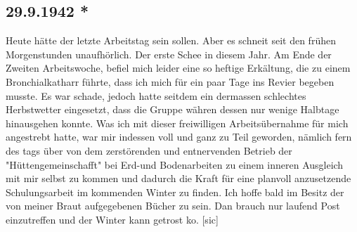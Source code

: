 \subsection{29.9.1942 *}

Heute h\"{a}tte der letzte Arbeitstag sein sollen.
Aber es schneit seit den fr\"{u}hen Morgenstunden unaufh\"{o}rlich.
Der erste Schee in diesem Jahr.
Am Ende der Zweiten Arbeitswoche, befiel mich leider eine so heftige Erk\"{a}ltung, die zu einem Bronchialkatharr f\"{u}hrte, dass ich mich f\"{u}r ein paar Tage ins Revier begeben musste.
Es war schade, jedoch hatte seitdem ein dermassen schlechtes Herbstwetter eingesetzt, dass die Gruppe w\"{a}hren dessen nur wenige Halbtage hinausgehen konnte.
Was ich mit dieser freiwilligen Arbeits\"{u}bernahme f\"{u}r mich angestrebt hatte, war mir indessen voll und ganz zu Teil geworden, n\"{a}mlich fern des tags \"{u}ber von dem zerst\"{o}renden und entnervenden Betrieb der "H\"{u}ttengemeinschafft" bei Erd-und Bodenarbeiten zu einem inneren Ausgleich mit mir selbst zu kommen und dadurch die Kraft f\"{u}r eine planvoll anzusetzende Schulungsarbeit im kommenden Winter zu finden.
Ich hoffe bald im Besitz der von meiner Braut aufgegebenen B\"{u}cher zu sein.
Dan brauch nur laufend Post einzutreffen und der Winter kann getrost ko.{\color{red} [sic] }

\clearpage
